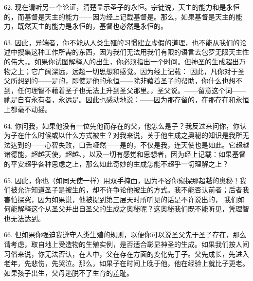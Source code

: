 \par

62. 现在请听另一个论证，清楚显示圣子的永恒。宗徒说，天主的能力和是永恒的，而基督是天主的能力——因为经上记载基督是。那么，如果基督是天主的能力，既然天主的能力是永恒的，基督也必然是永恒的。\par

63. 因此，异端者，你不能从人类生殖的习惯建立虚假的道理，也不能从我们的论述中搜集这种工作所需的东西，因为我们无法用我们有限的语言去包罗无限天主性的伟大，。如果你试图解释人的出生，你必须指出一个时间。但神圣的生成超出万物之上；它广阔深远，远超一切思想和感觉。因为经上记载： 因此，凡你对于圣父所想到的——是的，即使是他的永恒——除非藉着圣子的帮助，你什么也想不到，任何理智不藉着圣子也无法上升到圣父那里。，圣父说。——留意这个词——祂是自有永有者，永远是。因此也感动地说：——因为那存留的，在那存在和永恒上都毫不动摇。\par

64. 你问我，如果他没有一位先他而存在的父，他怎么是子？我反过来问你，你认为子在什么时候或以什么方式被生？对我来说，关于他生成之奥秘的知识是我所无法达到的——心智失败，口舌哑然——是的，不仅是我，连天使也是如此。它超越诸德能，超越天使，超越、，以及一切有感觉和思想者，因为经上记载：如果基督的平安超乎各种思虑之上，那么如此奇妙的生成怎能不超乎一切理解之上？\par

65. 因此，你也（如同天使一样）用双手掩面，因为不容你窥探那超越的奥秘！我们被允许知道圣子是被生的，却不许争论他被生的方式。我不能否认前者；后者我害怕探究，因为如果说，他被提到第三层天时所听见的话是不许说出的， 我们如何能解释这个从圣父并出自圣父的生成之奥秘呢？这奥秘我们既不能听见，凭理智也无法达到。\par

66. 但如果你强迫我遵守人类生殖的规则，以便你可以说圣父先于圣子存在，那么请考虑，取自地上受造物的生殖实例，是否适合彰显神圣的生成。如果我们按人间习俗来说，你无法否认，在人中，父在存在方面的变化先于子。父先成长，先进入老年，先悲伤，先哭泣。那么，如果子在时间上晚于他，他在经验上就比子更老。如果孩子出生，父母逃脱不了生育的羞耻。\par

